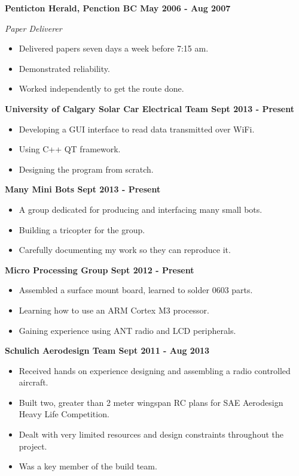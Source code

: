 \documentclass[12pt]{article} %
\begin{document}
\noindent \centerline{ \bf Penticton Herald, Penction BC \hfill May 2006 - Aug 2007}
\indent \emph{ Paper Deliverer}
\begin{itemize}[noitemsep]
  \item Delivered papers seven days a week before 7:15 am.
  \item Demonstrated reliability.
  \item Worked independently to get the route done.
\end{itemize}

\bigskip
{}
\bigskip

\noindent \centerline{\bf University of Calgary Solar Car Electrical Team \hfill Sept 2013 - Present}
\begin{itemize}[noitemsep]
  \item Developing a GUI interface to read data transmitted over WiFi.
  \item Using C++ QT framework. 
  \item Designing the program from scratch.
\end{itemize}

\noindent \centerline{\bf Many Mini Bots \hfill Sept 2013 - Present}
\begin{itemize}[noitemsep]
  \item A group dedicated for producing and interfacing many small bots.
  \item Building a tricopter for the group.
  \item Carefully documenting my work so they can reproduce it.
\end{itemize}

\noindent \centerline{ \bf Micro Processing Group \hfill Sept 2012 - Present}
\begin{itemize}[noitemsep]
  \item Assembled a surface mount board, learned to solder 0603 parts.
  \item Learning how to use an ARM Cortex M3 processor.
  \item Gaining experience using ANT radio and LCD peripherals.
\end{itemize}


\noindent \centerline{ \bf Schulich Aerodesign Team \hfill Sept 2011 - Aug 2013}
\begin{itemize}[noitemsep]
  \item Received hands on experience  designing and assembling a radio controlled aircraft.
  \item Built two, greater than 2 meter wingspan RC plans for SAE Aerodesign Heavy Life Competition.
  \item Dealt with very limited resources and design constraints throughout the project.
  \item Was a key member of the build team.
\end{itemize}
\end{document}
